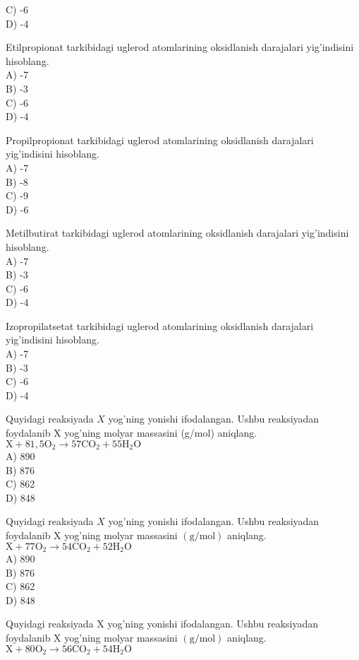 C) -6\\
D) -4
  \item Etilpropionat tarkibidagi uglerod atomlarining oksidlanish darajalari yig'indisini hisoblang.\\
A) -7\\
B) -3\\
C) -6\\
D) -4
  \item Propilpropionat tarkibidagi uglerod atomlarining oksidlanish darajalari yig'indisini hisoblang.\\
A) -7\\
B) -8\\
C) -9\\
D) -6
  \item Metilbutirat tarkibidagi uglerod atomlarining oksidlanish darajalari yig'indisini hisoblang.\\
A) -7\\
B) -3\\
C) -6\\
D) -4
  \item Izopropilatsetat tarkibidagi uglerod atomlarining oksidlanish darajalari yig'indisini hisoblang.\\
A) -7\\
B) -3\\
C) -6\\
D) -4
  \item Quyidagi reaksiyada $X$ yog'ning yonishi ifodalangan. Ushbu reaksiyadan foydalanib X yog'ning molyar massasini (g/mol) aniqlang.\\
$\mathrm{X}+81,5 \mathrm{O}_{2} \rightarrow 57 \mathrm{CO}_{2}+55 \mathrm{H}_{2} \mathrm{O}$\\
A) 890\\
B) 876\\
C) 862\\
D) 848
  \item Quyidagi reaksiyada $X$ yog'ning yonishi ifodalangan. Ushbu reaksiyadan foydalanib X yog'ning molyar massasini $(\mathrm{g} / \mathrm{mol})$ aniqlang. $\mathrm{X}+77 \mathrm{O}_{2} \rightarrow 54 \mathrm{CO}_{2}+52 \mathrm{H}_{2} \mathrm{O}$\\
A) 890\\
B) 876\\
C) 862\\
D) 848
  \item Quyidagi reaksiyada X yog'ning yonishi ifodalangan. Ushbu reaksiyadan foydalanib X yog'ning molyar massasini $(\mathrm{g} / \mathrm{mol})$ aniqlang. $\mathrm{X}+80 \mathrm{O}_{2} \rightarrow 56 \mathrm{CO}_{2}+54 \mathrm{H}_{2} \mathrm{O}$\\
